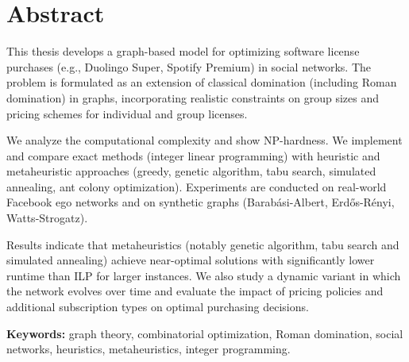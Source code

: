 \section*{Abstract}

This thesis develops a graph-based model for optimizing software license purchases (e.g., Duolingo Super, Spotify Premium) in social networks. The problem is formulated as an extension of classical domination (including Roman domination) in graphs, incorporating realistic constraints on group sizes and pricing schemes for individual and group licenses.

We analyze the computational complexity and show NP-hardness. We implement and compare exact methods (integer linear programming) with heuristic and metaheuristic approaches (greedy, genetic algorithm, tabu search, simulated annealing, ant colony optimization). Experiments are conducted on real-world Facebook ego networks and on synthetic graphs (Barabási-Albert, Erdős-Rényi, Watts-Strogatz).

Results indicate that metaheuristics (notably genetic algorithm, tabu search and simulated annealing) achieve near-optimal solutions with significantly lower runtime than ILP for larger instances. We also study a dynamic variant in which the network evolves over time and evaluate the impact of pricing policies and additional subscription types on optimal purchasing decisions.

\textbf{Keywords:} graph theory, combinatorial optimization, Roman domination, social networks, heuristics, metaheuristics, integer programming.
